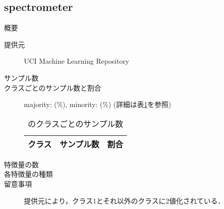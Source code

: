 \subsection{spectrometer}
\begin{description}
    \item[概要] \cite{}
    \item[提供元] UCI Machine Learning Repository
    \item[サンプル数] 
    \item[クラスごとのサンプル数と割合] majority:  (\%), minority:  (\%) (詳細は表\ref{tab:}を参照)

        \begin{table}
            \centering
            \caption{のクラスごとのサンプル数}
            \label{tab:}
            \begin{tabular}{lrc} \hline
                \multicolumn{1}{c}{クラス}&
                \multicolumn{1}{c}{サンプル数}&
                \multicolumn{1}{c}{割合}\\
                \hline
                \hline

                \hline
            \end{tabular}
        \end{table}

    \item[特徴量の数] 
    \item[各特徴量の種類] \mbox{}
        
    \item[留意事項] 提供元により，クラス1とそれ以外のクラスに2値化されている．
\end{description}

